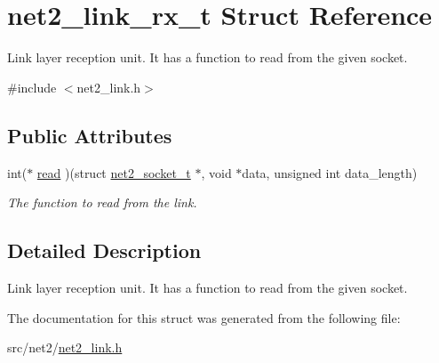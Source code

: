 \hypertarget{structnet2__link__rx__t}{}\section{net2\+\_\+link\+\_\+rx\+\_\+t Struct Reference}
\label{structnet2__link__rx__t}


Link layer reception unit. It has a function to read from the given socket.  




{\ttfamily \#include $<$net2\+\_\+link.\+h$>$}

\subsection*{Public Attributes}
\begin{DoxyCompactItemize}
\item 
\hypertarget{structnet2__link__rx__t_abd8baf6d93b9187ab09c7e91eb6a70d9}{}int($\ast$ \hyperlink{structnet2__link__rx__t_abd8baf6d93b9187ab09c7e91eb6a70d9}{read} )(struct \hyperlink{structnet2__socket__t}{net2\+\_\+socket\+\_\+t} $\ast$, void $\ast$data, unsigned int data\+\_\+length)\label{structnet2__link__rx__t_abd8baf6d93b9187ab09c7e91eb6a70d9}

\begin{DoxyCompactList}\small\item\em The function to read from the link. \end{DoxyCompactList}\end{DoxyCompactItemize}


\subsection{Detailed Description}
Link layer reception unit. It has a function to read from the given socket. 

The documentation for this struct was generated from the following file\+:\begin{DoxyCompactItemize}
\item 
src/net2/\hyperlink{net2__link_8h}{net2\+\_\+link.\+h}\end{DoxyCompactItemize}
